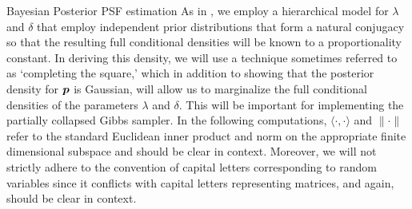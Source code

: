 \begin{chapter}{Bayesian Posterior PSF estimation}
As in \citep{bardsley2012mcmc}, we employ a hierarchical model for $\lambda$ and $\delta$ that employ independent prior distributions that form a natural conjugacy so that the resulting full conditional densities will be known to a proportionality constant.
In deriving this density, we will use a technique sometimes referred to as `completing the square,' which in addition to showing that the posterior density for $\mbox{\boldmath$p$}$ is Gaussian, will allow us to marginalize the full conditional densities of the parameters $\lambda$ and $\delta$.
This will be important for implementing the partially collapsed Gibbs sampler.
In the following computations, $\langle \cdot, \cdot \rangle$ and $\|\cdot\|$ refer to the standard Euclidean inner product and norm on the appropriate finite dimensional subspace and should be clear in context.
Moreover, we will not strictly adhere to the convention of capital letters corresponding to random variables since it conflicts with capital letters representing matrices, and again, should be clear in context.


\end{chapter}
